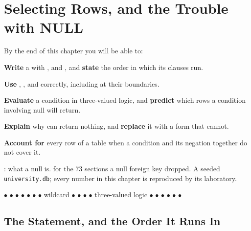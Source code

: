 \chapter{Selecting Rows, and the Trouble with NULL}\label{ch:select}

\begin{outcomes}
By the end of this chapter you will be able to:
\begin{tight}
  \item \textbf{Write} a  with , 
        and , and \textbf{state} the order in which its clauses
        run.
  \item \textbf{Use} , ,  and
         correctly, including at their boundaries.
  \item \textbf{Evaluate} a condition in three-valued logic, and
        \textbf{predict} which rows a condition involving null will return.
  \item \textbf{Explain} why  can return nothing, and
        \textbf{replace} it with a form that cannot.
  \item \textbf{Account for} every row of a table when a condition and its
        negation together do not cover it.
\end{tight}
\end{outcomes}

\begin{prereq}
: what a null is.  for the 73 sections a null
foreign key dropped. A seeded \texttt{university.db}; every number in this
chapter is reproduced by its laboratory.
\end{prereq}

\begin{keyterms}
 $\bullet$  $\bullet$  $\bullet$
 $\bullet$  $\bullet$  $\bullet$
 $\bullet$ wildcard $\bullet$  $\bullet$
 $\bullet$  $\bullet$ three-valued logic $\bullet$
\unk{} $\bullet$  $\bullet$ 
$\bullet$  $\bullet$  $\bullet$ 
\end{keyterms}

\section{The Statement, and the Order It Runs In}

